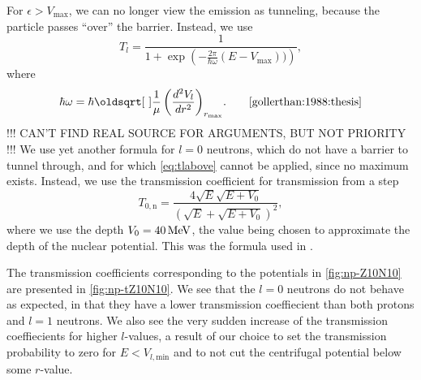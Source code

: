 For $\epsilon>V_\text{max}$, we can no longer view the emission as tunneling, because the particle passes ``over'' the barrier. Instead, we use
\begin{equation}
T_l = \frac{1}{1+\exp{\left(-\frac{2\pi}{\hbar \omega}(E-V_\text{max}))\right)}},\label{eq:tlabove}
\end{equation}
where
\begin{equation}
\hbar\omega = \hbar\sqrt{\frac{1}{\mu}\left(\frac{d^2V_l}{dr^2}\right)_{r_\text{max}}}.\qquad\cite{gollerthan:1988:thesis}
\end{equation}
!!! CAN'T FIND REAL SOURCE FOR ARGUMENTS, BUT NOT PRIORITY !!!
We use yet another formula for $l=0$ neutrons, which do not have a barrier to tunnel through, and for which \autoref{eq:tlabove} cannot be applied, since no maximum exists. Instead, we use the transmission coefficient for transmission from a step 
\begin{equation}
T_{0,\text{n}} = \frac{4\sqrt{E}\sqrt{E+V_0}}{(\sqrt{E}+\sqrt{E+V_0})^2},\label{eq:t0n}
\end{equation}
where we use the depth $V_0=\unit[40]{MeV}$, the value being chosen to approximate the depth of the nuclear potential\cite{welldepth}. This was the formula used in .

The transmission coefficients corresponding to the potentials in \autoref{fig:np-Z10N10} are presented in \autoref{fig:np-tZ10N10}.  We see that the $l=0$ neutrons do not behave as expected, in that they have a lower transmission coeffiecient than both protons and $l=1$ neutrons. We also see the very sudden increase of the transmission coeffiecients for higher $l$-values, a result of our choice to set the transmission probability to zero for $E<V_{l,\text{min}}$ and to not cut the centrifugal potential below some $r$-value.

